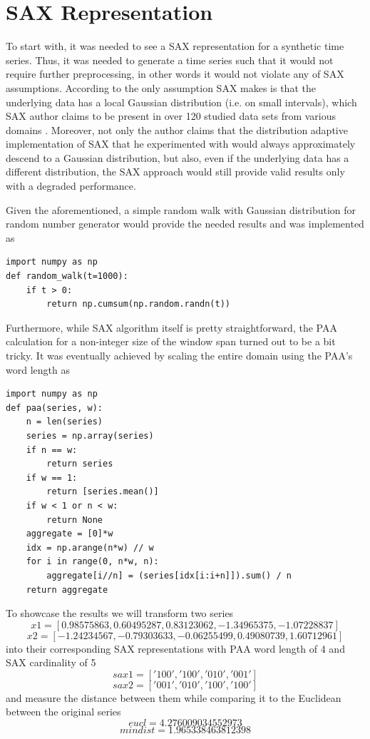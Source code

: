 \documentclass{article}
\begin{document}
\section{SAX Representation}
To start with, it was needed to see a SAX representation for a synthetic time series. Thus, it was needed to generate a time series such that it would not require further preprocessing, in other words it would not violate any of SAX assumptions. According to \cite{shieh2008sax} the only assumption SAX makes is that the underlying data has a local Gaussian distribution (i.e. on small intervals), which SAX author claims to be present in over 120 studied data sets from various domains \cite{keogh2006sax_presentation}. Moreover, not only the author claims that the distribution adaptive implementation of SAX that he experimented with would always approximately descend to a Gaussian distribution, but also, even if the underlying data has a different distribution, the SAX approach would still provide valid results only with a degraded performance.\par
Given the aforementioned, a simple random walk with Gaussian distribution for random number generator would provide the needed results and was implemented as
\begin{lstlisting}
import numpy as np
def random_walk(t=1000):
    if t > 0:
        return np.cumsum(np.random.randn(t))
\end{lstlisting}
Furthermore, while SAX algorithm itself is pretty straightforward, the PAA \cite{keogh2001dimensionality} calculation for a non-integer size of the window span turned out to be a bit tricky. It was eventually achieved by scaling the entire domain using the PAA's word length as
\begin{lstlisting}
import numpy as np
def paa(series, w):
    n = len(series)
    series = np.array(series)
    if n == w:
        return series
    if w == 1:
        return [series.mean()]
    if w < 1 or n < w:
        return None
    aggregate = [0]*w
    idx = np.arange(n*w) // w
    for i in range(0, n*w, n):
        aggregate[i//n] = (series[idx[i:i+n]]).sum() / n
    return aggregate
\end{lstlisting}
To showcase the results we will transform two series
$$x1=[ 0.98575863,  0.60495287,  0.83123062, -1.34965375, -1.07228837]$$
$$x2=[-1.24234567, -0.79303633, -0.06255499,  0.49080739,  1.60712961]$$
into their corresponding SAX representations with PAA word length of 4 and SAX cardinality of 5
$$sax1=['100', '100', '010', '001']$$
$$sax2=['001', '010', '100', '100']$$
and measure the distance between them while comparing it to the Euclidean between the original series
$$eucl=4.276009034552973$$
$$mindist=1.965338463812398$$
\end{document}
